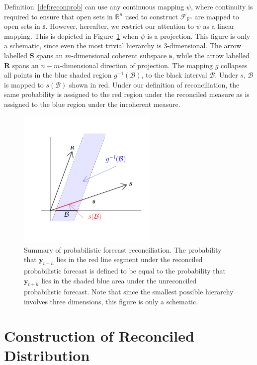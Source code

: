 \documentclass[12pt]{article}
\theoremstyle{definition}
\begin{document}
Definition~\ref{def:reconprob} can use any continuous mapping $\psi$, where continuity is required to ensure that open sets in $\mathbb{R}^n$ used to construct $\mathscr{F}_{\mathbb{R}^n}$ are mapped to open sets in $\mathfrak{s}$.  However, hereafter, we restrict our attention to $\psi$ as a linear mapping.  This is depicted in Figure~\ref{fig:probfr_sch} when $\psi$ is a projection.  This figure is only a schematic, since even the most trivial hierarchy is $3$-dimensional.  The arrow labelled $\bm{S}$ spans an $m$-dimensional coherent subspace $\mathfrak{s}$, while the arrow labelled $\bm{R}$ spans an $n-m$-dimensional direction of projection.  The mapping $g$ collapses all points in the blue shaded region $g^{-1}(\mathcal{B})$, to the black interval $\mathcal{B}$. Under $s$, $\mathcal{B}$ is mapped to $s(\mathcal{B})$ shown in red.  Under our definition of reconciliation, the same probability is assigned to the red region under the reconciled measure as is assigned to the blue region under the incoherent measure.

\begin{figure}
	\centering \includegraphics[width=0.6\textwidth]{Figs/probforerec_schematic.pdf}
	\caption{Summary of probabilistic forecast reconciliation. The probability that $\bm{y}_{t+h}$ lies in the red line segment under the reconciled probabilistic forecast is defined to be equal to the probability that $\bm{y}_{t+h}$ lies in the shaded blue area under the unreconciled probabilistic forecast. Note that since the smallest possible hierarchy involves three dimensions, this figure is only a schematic.}\label{fig:probfr_sch}
\end{figure}

\section{Construction of Reconciled Distribution} \label{sec:AnalyticalSolution}
\end{document}
